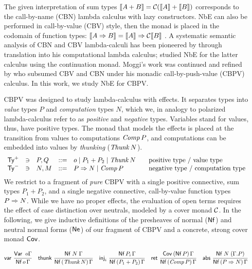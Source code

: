 \documentclass[a4paper]{easychair}
\renewcommand{\patom}{\ensuremath{o}}
\begin{document}
The given interpretation of sum types
$\mathopen{{[\kern-0.14em[}} A + B \mathclose{{]\kern-0.14em]}} = \mathcal{C}(\mathopen{{[\kern-0.14em[}} A \mathclose{{]\kern-0.14em]}} + \mathopen{{[\kern-0.14em[}} B \mathclose{{]\kern-0.14em]}})$ corresponds to the call-by-name
(CBN) lambda calculus with lazy constructors.  NbE can also be
performed in call-by-value (CBV) style, then the monad is placed in
the codomain of function types: $\mathopen{{[\kern-0.14em[}} A \Rightarrow B \mathclose{{]\kern-0.14em]}} = \mathopen{{[\kern-0.14em[}} A \mathclose{{]\kern-0.14em]}} \Rightarrow \mathcal{C} \mathopen{{[\kern-0.14em[}} B \mathclose{{]\kern-0.14em]}}$
\citep{danvy:popl96}.  A systematic semantic analysis of CBN and CBV
lambda-calculi has been pioneered by \citet{moggi:infcomp91} through
translation into his computational lambda calculus;
\citet{filinski:tlca01} studied NbE for the latter calculus using the
continuation monad.  Moggi's work was continued and refined
by \citet{levy:hosc06} who subsumed CBV and CBN under his monadic
call-by-push-value (CBPV) calculus.  In this work, we study NbE for CBPV.

CBPV was designed to study lambda-calculus with effects.  It separates
types into \emph{value} types $P$ and \emph{computation} types $N$, which we, in
analogy to polarized lambda-calculus
\citep{zeilberger:PhD,brockNannestadSchuermann:lpar10,espiritoSanto:entcs17}
refer to as \emph{positive} and \emph{negative} types.
Variables stand for values, thus, have positive types.
The monad that models the effects is placed at the transition from values
to computations $\mathit{Comp}\,P$, and computations can be embedded into
values by \emph{thunking} ($\mathit{Thunk}\,N$).
\[
\begin{array}{lllrl@{\qquad}l}
  \PTy & \ni & P,Q & ::= & \patom
    \mid P_1 + P_2
    \mid \Thunk N
  & \mbox{positive type / value type}
\\
  \NTy & \ni & N,M & ::= & %
    P \To N
    \mid \Comp P
  & \mbox{negative type / computation type}
\\
\end{array}
\]
We restrict to a fragment of \emph{pure} CBPV
with a single positive connective, sum
types $P_1 + P_2$, and a single negative connective, call-by-value
function types $P \Rightarrow N$.  While we have no proper effects, the
evaluation of open terms requires the effect of case distinction over
neutrals, modeled by a cover monad $\mathcal{C}$.  In the following, we give
inductive definitions of the presheaves of
normal ($\mathsf{Nf}$) and neutral normal forms
($\mathsf{Ne}^{}$) of our fragment of CBPV and a concrete, strong cover monad $\mathsf{Cov}^{}$.
\begin{small}
\begin{gather*}
  \nru{\tvar}{\Var \patom \Gamma}{\PValNf {\patom} \Gamma}
\quad
  \nru{\tthunk}{\Nf N \Gamma}{\PValNfP{\Thunk N}\Gamma}
\quad
  \nru{\tinj_i}{\PValNf{P_i}\Gamma}{\PValNfP{P_1 + P_2}\Gamma}
\quad
  \nru{\tret}
      {\CoverP {\tVNf\,P}  \Gamma}
      {\NfP {\Comp P} \Gamma}
\quad
  \nru{\tabs}
      {\Nf N {(\cext \Gamma P)}}
      {\NfP {P \To N} \Gamma}
\end{gather*}
\end{small}
\end{document}
